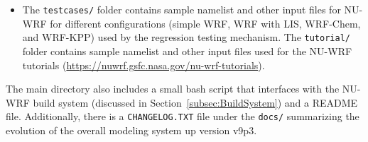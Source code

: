 \begin{itemize}
\begin{itemize}
   \end{itemize}
  \item The \texttt{testcases/} folder contains sample namelist and other 
    input files for NU-WRF for different configurations (simple WRF,
    WRF with LIS, WRF-Chem, and WRF-KPP) used by the regression testing mechanism.
    The \texttt{tutorial/} folder contains sample namelist and other input files used
    for the NU-WRF tutorials (\url{https://nuwrf.gsfc.nasa.gov/nu-wrf-tutorials}).

\end{itemize}

The main directory also includes a small bash script that interfaces with the NU-WRF build 
system (discussed in Section~\ref{subsec:BuildSystem}) and a README file. Additionally, there is a 
\texttt{CHANGELOG.TXT} file under the \texttt{docs/} summarizing the evolution of the overall modeling
system up version v9p3.
